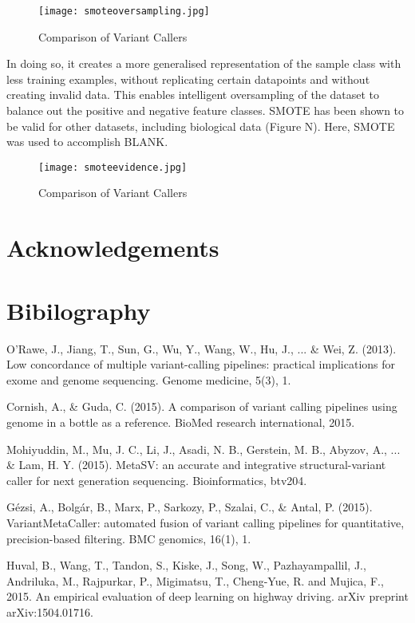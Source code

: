\documentclass{article}
\begin{document}
\begin{figure}[H]
\texttt{[image: smoteoversampling.jpg]}
\caption{Comparison of Variant Callers}
\centering
\end{figure}

In doing so, it creates a more generalised representation of the sample class with less training examples, without replicating certain datapoints and without creating invalid data. This enables intelligent oversampling of the dataset to balance out the positive and negative feature classes. SMOTE has been shown to be valid for other datasets, including biological data (Figure N). Here, SMOTE was used to accomplish BLANK.

\begin{figure}[H]
\texttt{[image: smoteevidence.jpg]}
\caption{Comparison of Variant Callers}
\centering
\end{figure}

\section{Acknowledgements}

\section{Bibilography}

\begin{thebibliography}{9}
O'Rawe, J., Jiang, T., Sun, G., Wu, Y., Wang, W., Hu, J., ... \& Wei, Z. (2013). Low concordance of multiple variant-calling pipelines: practical implications for exome and genome sequencing. Genome medicine, 5(3), 1.
 
 Cornish, A., \& Guda, C. (2015). A comparison of variant calling pipelines using genome in a bottle as a reference. BioMed research international, 2015.

Mohiyuddin, M., Mu, J. C., Li, J., Asadi, N. B., Gerstein, M. B., Abyzov, A., ... \& Lam, H. Y. (2015). MetaSV: an accurate and integrative structural-variant caller for next generation sequencing. Bioinformatics, btv204.

Gézsi, A., Bolgár, B., Marx, P., Sarkozy, P., Szalai, C., \& Antal, P. (2015). VariantMetaCaller: automated fusion of variant calling pipelines for quantitative, precision-based filtering. BMC genomics, 16(1), 1.

Huval, B., Wang, T., Tandon, S., Kiske, J., Song, W., Pazhayampallil, J., Andriluka, M., Rajpurkar, P., Migimatsu, T., Cheng-Yue, R. and Mujica, F., 2015. An empirical evaluation of deep learning on highway driving. arXiv preprint arXiv:1504.01716.

\end{thebibliography}
\end{document}

